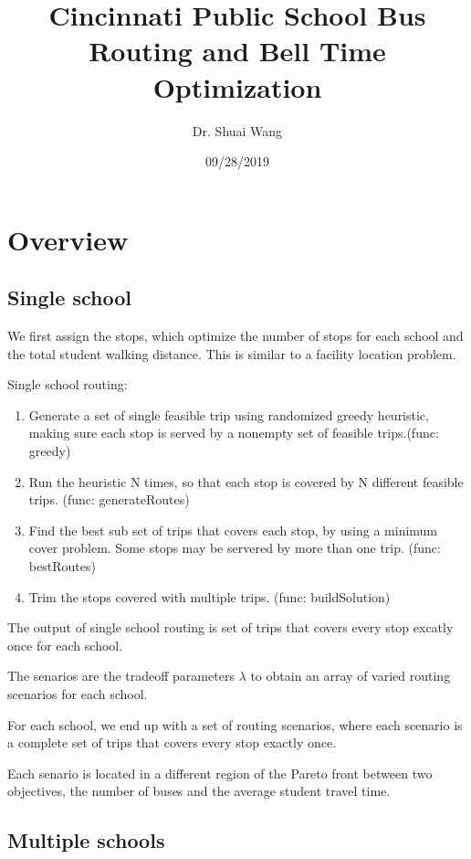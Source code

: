 \documentclass[11pt]{article}
\author{Dr. Shuai Wang}
\date{09/28/2019}
\title{Cincinnati Public School Bus Routing and Bell Time Optimization}
\begin{document}
\maketitle
\tableofcontents


\section{Overview}
\label{sec:org2f91e07}
\subsection{Single school}
\label{sec:orgd7ce842}

We first assign the stops, which optimize the number of stops for each school and the total student walking distance.
This is similar to a facility location problem. 

Single school routing:

\begin{enumerate}
\item Generate a set of single feasible trip using randomized greedy heuristic, making sure each stop is served by a nonempty set of feasible trips.(func: greedy)
\item Run the heuristic N times, so that each stop is covered by N different feasible trips. (func: generateRoutes)
\item Find the best sub set of trips that covers each stop, by using a minimum cover problem. Some stops may be servered by more than one trip. (func: bestRoutes)
\item Trim the stops covered with multiple trips. (func: buildSolution)
\end{enumerate}

The output of single school routing is set of trips that covers every stop
excatly once for each school.

The senarios are the tradeoff parameters \(\lambda\) to obtain an array of varied
routing scenarios for each school.

For each school, we end up with a set of routing scenarios, where each scenario
is a complete set of trips that covers every stop exactly once.

Each senario is located in a different region of the Pareto front between two objectives,
the number of buses and the average student travel time.

\subsection{Multiple schools}
\label{sec:orga4d74b9}
\end{document}
